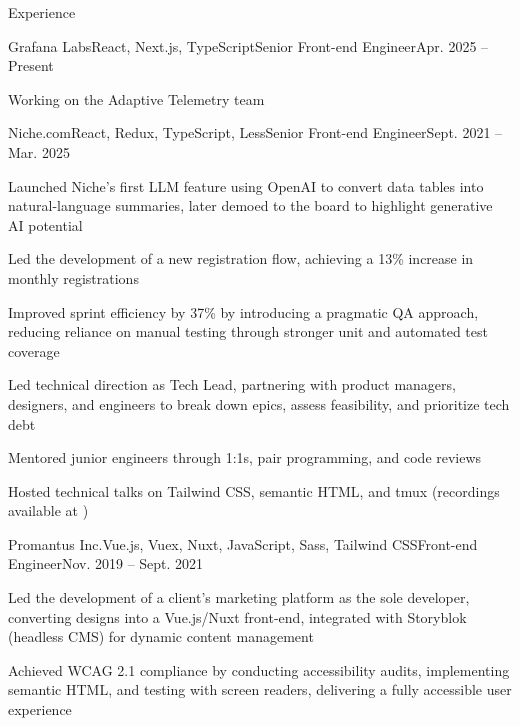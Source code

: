\documentclass{resume} %
\begin{document}
\begin{rSection}{Experience}

  \begin{rSubsection}{Grafana Labs}{React, Next.js, TypeScript}{Senior Front-end Engineer}{Apr. 2025 – Present}
    \item Working on the Adaptive Telemetry team
  \end{rSubsection}
  
  \begin{rSubsection}{Niche.com}{React, Redux, TypeScript, Less}{Senior Front-end Engineer}{Sept. 2021 – Mar. 2025}
    \item Launched Niche’s first LLM feature using OpenAI to convert data tables into natural-language summaries, later demoed to the board to highlight generative AI potential
    \item Led the development of a new registration flow, achieving a 13\% increase in monthly registrations
    \item Improved sprint efficiency by 37\% by introducing a pragmatic QA approach, reducing reliance on manual testing through stronger unit and automated test coverage
    \item Led technical direction as Tech Lead, partnering with product managers, designers, and engineers to break down epics, assess feasibility, and prioritize tech debt
    \item Mentored junior engineers through 1:1s, pair programming, and code reviews
    \item Hosted technical talks on Tailwind CSS, semantic HTML, and tmux (recordings available at \href{http://jgs.lol/}{})
  \end{rSubsection}

  \begin{rSubsection}{Promantus Inc.}{Vue.js, Vuex, Nuxt, JavaScript, Sass, Tailwind CSS}{Front-end Engineer}{Nov. 2019 – Sept. 2021}
    \item Led the development of a client’s marketing platform as the sole developer, converting designs into a Vue.js/Nuxt front-end, integrated with Storyblok (headless CMS) for dynamic content management
    \item Achieved WCAG 2.1 compliance by conducting accessibility audits, implementing semantic HTML, and testing with screen readers, delivering a fully accessible user experience
  \end{rSubsection}

\end{rSection}
\end{document}
